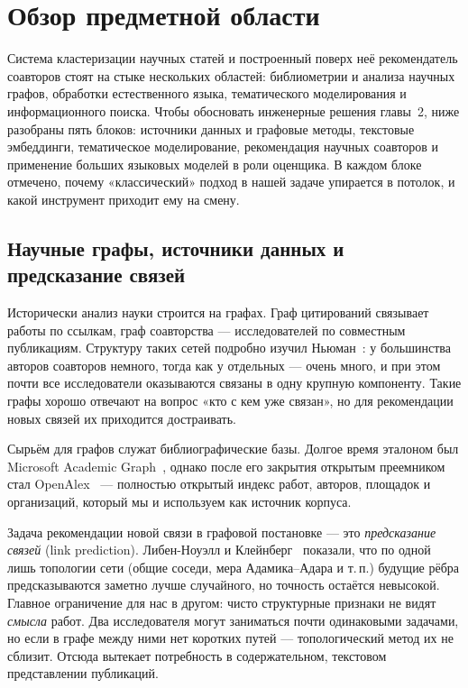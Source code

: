 \newpage
\section{Обзор предметной области}
\label{ch:review}

Система кластеризации научных статей и построенный поверх неё рекомендатель соавторов стоят на
стыке нескольких областей: библиометрии и анализа научных графов, обработки естественного языка,
тематического моделирования и информационного поиска. Чтобы обосновать инженерные решения главы~2,
ниже разобраны пять блоков: источники данных и графовые методы, текстовые эмбеддинги, тематическое
моделирование, рекомендация научных соавторов и применение больших языковых моделей в роли
оценщика. В каждом блоке отмечено, почему «классический» подход в нашей задаче упирается в потолок,
и какой инструмент приходит ему на смену.

\subsection{Научные графы, источники данных и предсказание связей}

Исторически анализ науки строится на графах. Граф цитирований связывает работы по ссылкам, граф
соавторства — исследователей по совместным публикациям. Структуру таких сетей подробно изучил
Ньюман~\cite{newman2001coauthorship}: у большинства авторов соавторов немного, тогда как у
отдельных — очень много, и при этом почти все исследователи оказываются связаны в одну крупную
компоненту. Такие графы хорошо отвечают на вопрос «кто с кем уже связан», но для рекомендации
новых связей их приходится достраивать.

Сырьём для графов служат библиографические базы. Долгое время эталоном был Microsoft Academic
Graph~\cite{sinha2015mag}, однако после его закрытия открытым преемником стал
OpenAlex~\cite{priem2022openalex} — полностью открытый индекс работ, авторов, площадок и
организаций, который мы и используем как источник корпуса.

Задача рекомендации новой связи в графовой постановке — это \emph{предсказание связей} (link
prediction). Либен-Ноуэлл и Клейнберг~\cite{libennowell2007link} показали, что по одной лишь
топологии сети (общие соседи, мера Адамика–Адара и т.\,п.) будущие рёбра предсказываются заметно
лучше случайного, но точность остаётся невысокой. Главное ограничение для нас в другом: чисто
структурные признаки не видят \emph{смысла} работ. Два исследователя могут заниматься почти
одинаковыми задачами, но если в графе между ними нет коротких путей — топологический метод их не
сблизит. Отсюда вытекает потребность в содержательном, текстовом представлении публикаций.

